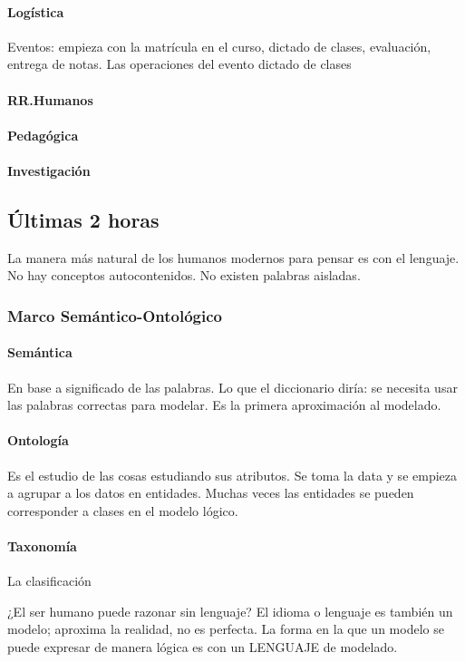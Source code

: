 \paragraph*{Logística} Eventos: empieza con la matrícula en el curso, 
dictado de clases, evaluación, entrega de notas.
Las operaciones del evento dictado de clases    
\paragraph*{RR.Humanos} 
\paragraph*{Pedagógica}
\paragraph*{Investigación}

\subsection*{Últimas 2 horas}
La manera más natural de los humanos modernos para pensar es con el lenguaje. 
No hay conceptos autocontenidos. No existen palabras aisladas. 



\subsubsection*{Marco Semántico-Ontológico}
\paragraph*{Semántica} En base a significado de las palabras. Lo que el diccionario diría: se necesita usar las palabras correctas para modelar.
Es la primera aproximación al modelado.  
\paragraph*{Ontología} Es el estudio de las cosas estudiando sus atributos. Se toma la data
y se empieza a agrupar a los datos en entidades. Muchas veces las entidades se pueden corresponder a clases en 
el modelo lógico.
 
\paragraph*{Taxonomía} La clasificación

¿El ser humano puede razonar sin lenguaje? El idioma o lenguaje es también un modelo; aproxima la realidad, no es perfecta.
La forma en la que un modelo se puede expresar de manera lógica es con un LENGUAJE de modelado. 

